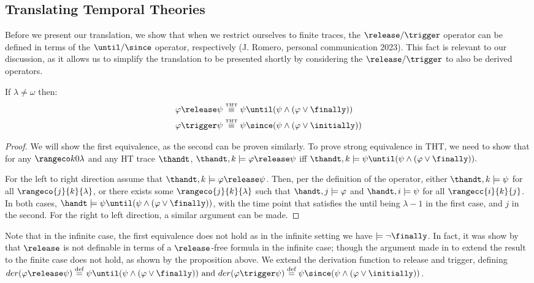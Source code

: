 \subsection{Translating Temporal Theories}

Before we present our translation, we show that when we restrict
ourselves to finite traces, the $\release/\trigger$ operator can be
defined in terms of the $\until/\since$ operator, respectively
(J. Romero, personal communication 2023).  This fact is relevant to
our discussion, as it allows us to simplify the translation to be
presented shortly by considering the $\release/\trigger$ to also be
derived operators.

\begin{proposition}

If $\lambda \neq \omega$ then:
\begin{align*}
\varphi \release \psi &\equivtht \psi \until (\psi \wedge (\varphi \vee \finally)) \\
\varphi \trigger \psi &\equivtht \psi \since (\psi \wedge (\varphi \vee \initially))
\end{align*}
\end{proposition}
\begin{proof}
  We will show the first equivalence, as the second can be proven
  similarly.  To prove strong equivalence in THT, we need to show that
  for any $\kinlambda$ and any HT trace $\thandt$,
  $\thandt,k \models \varphi \release \psi$ iff
  $\thandt,k \models \psi \until (\psi \wedge (\varphi \vee
  \finally)).$

  For the left to right direction assume that
  $\thandt,k \models \varphi \release \psi$. Then, per the definition
  of the operator, either $\thandt,k \models \psi$ for all
  $\rangeco{j}{k}{\lambda}$, or there exists some
  $\rangeco{j}{k}{\lambda}$ such that $\handt,j \models \varphi$ and
  $\handt,i \models \psi$ for all $\rangecc{i}{k}{j}$. In both cases,
  $\handt \models \psi \until (\psi \wedge (\varphi \vee \finally))$,
  with the time point that satisfies the until being $\lambda-1$ in
  the first case, and $j$ in the second. For the right to left
  direction, a similar argument can be made.
\end{proof}

Note that in the infinite case, the first equivalence does not hold as
in the infinite setting we have $\models \neg \finally$. In fact, it
was show by \cite{babodife20a} that $\release$ is not definable in
terms of a $\release$-free formula in the infinite case; though the
argument made in \cite[p. 20]{agcadipescscvi20a} to extend the result
to the finite case does not hold, as shown by the proposition
above. We extend the derivation function to release and trigger,
defining
$der(\varphi \release \psi) \defeq \psi \until (\psi \wedge (\varphi
\vee \finally)) \text{ and } der(\varphi \trigger \psi) \defeq \psi \since (\psi
\wedge (\varphi \vee \initially))$.

